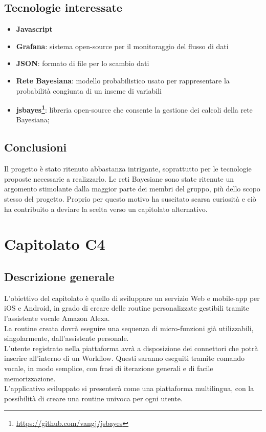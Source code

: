\documentclass[11pt,a4paper]{article}
\begin{document}
\subsection{Tecnologie interessate}
\begin{itemize}
\item \textbf{Javascript}
\item \textbf{Grafana}: sistema open-source per il monitoraggio del flusso di dati 
\item \textbf{JSON}: formato di file per lo scambio dati
\item \textbf{Rete Bayesiana}: modello probabilistico usato per rappresentare la probabilità congiunta di un inseme di variabili
\item \textbf{jsbayes\footnote{\url{https://github.com/vangj/jsbayes}}}: libreria open-source che consente la gestione dei calcoli della rete Bayesiana;
\end{itemize}

\subsection{Conclusioni}
	Il progetto è stato ritenuto abbastanza intrigante, soprattutto per le tecnologie proposte necessarie a realizzarlo. Le reti Bayesiane sono state ritenute un argomento stimolante dalla maggior parte dei membri del gruppo, più dello scopo stesso del progetto. Proprio per questo motivo ha suscitato scarsa curiosità e
	ciò ha contribuito a deviare la scelta verso un capitolato alternativo.
	\newpage
\section{Capitolato C4}
	\subsection{Descrizione generale}
L'obiettivo del capitolato è quello di sviluppare un servizio Web e mobile-app per iOS e Android, in grado di creare delle routine personalizzate gestibili tramite l'assistente vocale Amazon Alexa.
\\ 
La routine creata dovrà eseguire una sequenza di micro-funzioni già utilizzabili, singolarmente, dall'assistente personale.
\\
L'utente registrato nella piattaforma avrà a disposizione dei connettori che potrà inserire all'interno di un Workflow. Questi saranno eseguiti tramite comando vocale, in modo semplice, con frasi di iterazione generali e di facile memorizzazione.
\\
L'applicativo sviluppato si presenterà come una piattaforma multilingua, con la possibilità di creare una routine univoca per ogni utente.
\end{document}

